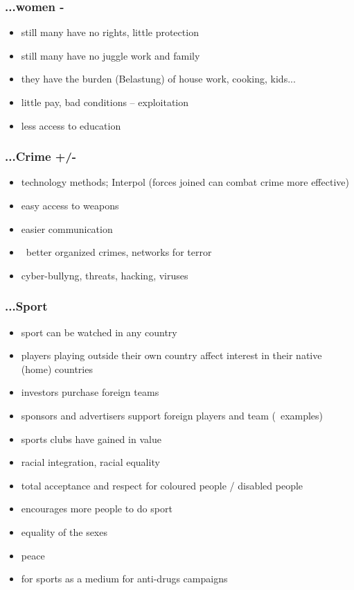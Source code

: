 \documentclass[a5paper,12pt,twoside,titlepage]{scrartcl}
\begin{document}
\subsubsection{...women -}
	\begin{itemize}
		\item still many have no rights, little protection
		\item still many have no juggle work and family
		\item they have the burden (Belastung) of house work, cooking, kids...
		\item little pay, bad conditions -- exploitation 
		\item less access to education 
	\end{itemize}
\subsubsection{...Crime +/-}
	\begin{itemize}
		\item technology methods; Interpol (forces joined can combat crime more effective)
		\item easy access to weapons
		\item easier communication
		\item \textrightarrow\ better organized crimes, networks for terror
		\item cyber-bullyng, threats, hacking, viruses
	\end{itemize}
\subsubsection{...Sport}
	\begin{itemize}
		\item sport can be watched in any country
		\item players playing outside their own country affect interest in their native (home) countries 
		\item investors purchase foreign teams
		\item sponsors and advertisers support foreign players and team (\textrightarrow\ examples)
		\item sports clubs have gained in value
		\item racial integration, racial equality
		\item total acceptance and respect for coloured people / disabled people
		\item encourages more people to do sport
		\item equality of the sexes
		\item peace
		\item for sports as a medium for anti-drugs campaigns
	\end{itemize}
\end{document}
